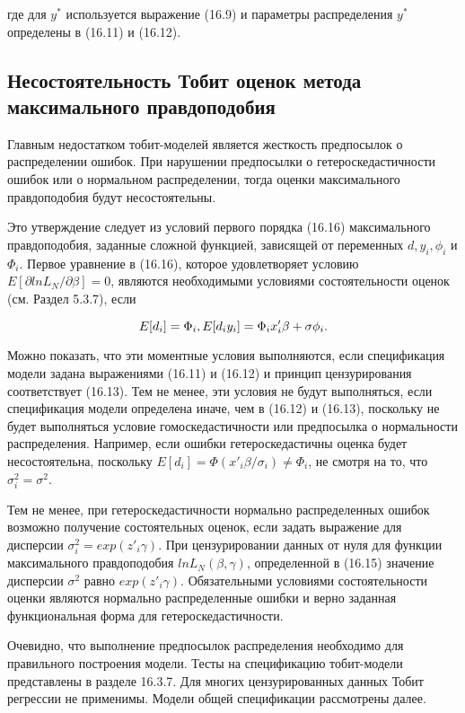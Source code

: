 где для $y^{*}$ используется выражение (16.9) и параметры распределения $y^{*}$ определены в (16.11) и (16.12).

\subsection{Несостоятельность Тобит оценок метода максимального правдоподобия}

Главным недостатком тобит-моделей является жесткость предпосылок о распределении ошибок. При нарушении предпосылки о гетероскедастичности ошибок или о нормальном распределении, тогда оценки максимального правдоподобия будут несостоятельны.

Это утверждение следует из условий первого порядка (16.16) максимального правдоподобия, заданные сложной функцией, зависящей от переменных $d, y_i, \phi_i$ и $\Phi_i$. Первое уравнение в (16.16), которое удовлетворяет условию $E[\partial{lnL_N}/\partial\beta]=0$, являются необходимыми условиями состоятельности оценок (см. Раздел 5.3.7), если

\[
E[d_i]=\Phi_i, \\
E[d_{i}y_{i}]=\Phi_{i}x'_{i}\beta+\sigma\phi_i.
\]

Можно показать, что эти моментные условия выполняются, если спецификация модели задана выражениями (16.11) и (16.12) и принцип цензурирования соответствует (16.13). Тем не менее, эти условия не будут выполняться, если спецификация модели определена иначе, чем в (16.12) и (16.13), поскольку не будет выполняться условие гомоскедастичности или предпосылка о нормальности распределения. Например, если ошибки гетероскедастичны оценка будет несостоятельна, поскольку $E[d_i]=\Phi(x'_{i}\beta/\sigma_{i}){\neq}\Phi_{i}$, не смотря на то, что $\sigma^2_i=\sigma^{2}$.

Тем не менее, при гетероскедастичности нормально распределенных ошибок возможно получение состоятельных оценок, если задать выражение для дисперсии $\sigma^2_i=exp(z'_i\gamma)$. При цензурировании данных от нуля для функции максимального правдоподобия $lnL_{N}(\beta,\gamma)$, определенной в (16.15) значение дисперсии $\sigma^2$ равно $exp(z'_i\gamma)$. Обязательными условиями состоятельности оценки являются нормально распределенные ошибки и верно заданная функциональная форма для гетероскедастичности.


Очевидно, что выполнение предпосылок распределения необходимо для правильного построения модели. Тесты на спецификацию тобит-модели представлены в разделе 16.3.7. Для многих цензурированных данных Тобит регрессии не применимы. Модели общей спецификации рассмотрены далее.


